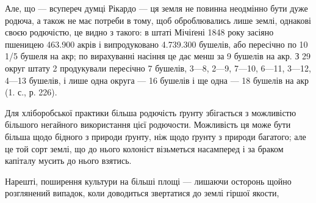 Але, що — всупереч думці Рікардо — ця земля не повинна неодмінно бути
дуже родюча, а також не має потреби в тому, щоб оброблювались лише землі,
однакові своєю родючістю, це видно з такого: в штаті Мічіґені 1848 року засіяно
пшеницею 463.900 акрів і випродуковано 4.739.300 бушелів, або пересічно по
10 1/5 бушеля на акр; по вирахуванні насіння це дає менш за 9 бушелів на
акр. З 29 округ штату 2 продукували пересічно 7 бушелів, 3—8, 2—9, 7—10, 6—11, 3—12, 4—13 бушелів, і
лише одна округа — 16 бушелів і ще одна — 18 бушелів на акр (1. с., р. 226).

Для хліборобської практики більша родючість ґрунту збігається з можливістю
більшого негайного використання цієї родючости. Можливість ця може бути
більша щодо бідного з природи ґрунту, ніж щодо ґрунту з природи багатого;
але це той сорт землі, що до нього колоніст візьметься насамперед і за браком
капіталу мусить до нього взятись.

Нарешті, поширення культури на більші площі — лишаючи осторонь щойно розглянений випадок, коли
доводиться звертатися до землі гіршої якости,